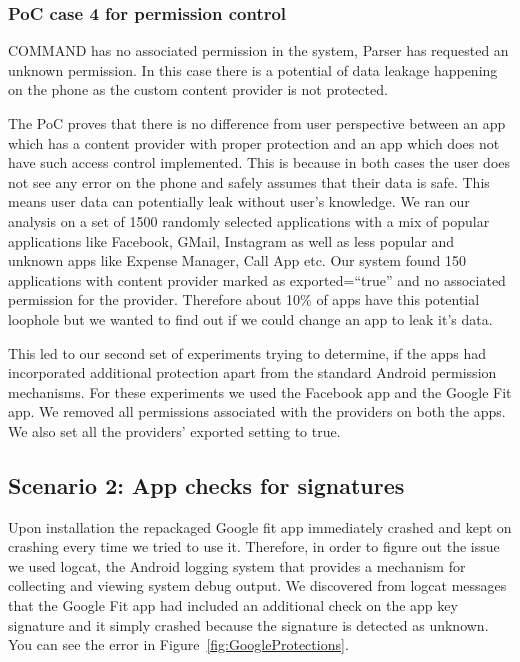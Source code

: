 \subsubsection{PoC case 4 for permission control} COMMAND has no associated permission in the system, Parser has requested an unknown permission. In this case there is a potential of data leakage happening on the phone as the custom content provider is not protected.

The PoC proves that there is no difference from user perspective between an app which has a content provider with proper protection and an app which does not have such access control implemented. This is because in both cases the user does not see any error on the phone and safely assumes that their data is safe. This means user data can potentially leak without user's knowledge. We ran our analysis on a set of 1500 randomly selected applications with a mix of popular applications like Facebook, GMail, Instagram as well as less popular and unknown apps like Expense Manager, Call App etc. Our system found 150 applications with content provider marked as exported=``true'' and no associated permission for the provider. Therefore about 10\% of apps have this potential loophole but we wanted to find out if we could change an app to leak it's data. 

This led to our second set of experiments trying to determine, if the apps had incorporated additional protection apart from the standard Android permission mechanisms. For these experiments we used the Facebook app and the Google Fit app. We removed all permissions associated with the providers on both the apps. We also set all the providers' exported setting to true.

\subsection{Scenario 2: App checks for signatures} Upon installation the repackaged Google fit app immediately crashed and kept on crashing every time we tried to use it. Therefore, in order to figure out the issue we used logcat, the Android logging system that provides a mechanism for collecting and viewing system debug output. We discovered from logcat messages that the Google Fit app had included an additional check on the app key signature and it simply crashed because the signature is detected as unknown. You can see the error in Figure~\ref{fig:GoogleProtections}.

